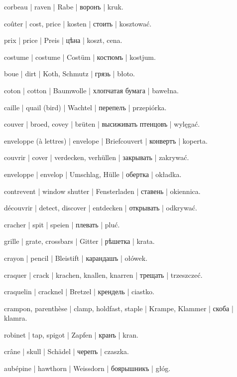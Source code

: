 \begin{outdent}{1em}
corbeau | raven | Rabe | воронъ | kruk.

coûter | cost, price | kosten | стоить | kosztować.

\uvsubentry{}
prix | price | Preis | цѣна | koszt, cena.

costume | costume | Costüm | костюмъ | kostjum.

boue | dirt | Koth, Schmutz | грязь | błoto.

coton | cotton | Baumwolle | хлопчатая бумага | bawełna.

caille | quail (bird) | Wachtel | перепелъ | przepiórka.

couver | broed, covey | brüten | высиживать птенцовъ | wylęgać.

enveloppe (à lettres) | envelope | Briefcouvert | конвертъ | koperta.

couvrir | cover | verdecken, verhüllen | закрывать | zakrywać.

\uvsubentry{}
enveloppe | envelop | Umschlag, Hülle | обертка | okładka.


\uvsubentry{}
contrevent | window shutter | Fensterladen | ставень | okiennica.


\uvsubentry{}
découvrir | detect, discover | entdecken | открывать | odkrywać.

cracher | spit | speien | плевать | pluć.

grille | grate, crossbars | Gitter | рѣшетка | krata.

crayon | pencil | Bleistift | карандашъ | ołówek.

craquer | crack | krachen, knallen, knarren | трещать | trzeszczeć.

craquelin | cracknel | Bretzel | крендель | ciastko.

crampon, parenthèse | clamp, holdfast, staple | Krampe,
Klammer | скоба | klamra.

robinet | tap, spigot | Zapfen | кранъ | kran.

crâne | skull | Schädel | черепъ | czaszka.

aubépine | hawthorn | Weissdorn | боярышникъ | głóg.


\end{outdent}
